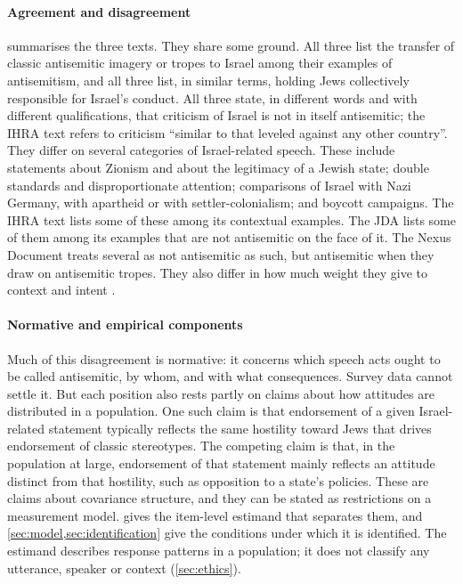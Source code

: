 \paragraph{Agreement and disagreement}
 summarises the three texts. They share some ground. All three list the transfer of classic antisemitic imagery or tropes to Israel among their examples of antisemitism, and all three list, in similar terms, holding Jews collectively responsible for Israel's conduct. All three state, in different words and with different qualifications, that criticism of Israel is not in itself antisemitic; the IHRA text refers to criticism ``similar to that leveled against any other country''. They differ on several categories of Israel-related speech. These include statements about Zionism and about the legitimacy of a Jewish state; double standards and disproportionate attention; comparisons of Israel with Nazi Germany, with apartheid or with settler-colonialism; and boycott campaigns. The IHRA text lists some of these among its contextual examples. The JDA lists some of them among its examples that are not antisemitic on the face of it. The Nexus Document treats several as not antisemitic as such, but antisemitic when they draw on antisemitic tropes. They also differ in how much weight they give to context and intent \citep{ihra2016,jda2021,nexus2021}.

\paragraph{Normative and empirical components}
Much of this disagreement is normative: it concerns which speech acts ought to be called antisemitic, by whom, and with what consequences. Survey data cannot settle it. But each position also rests partly on claims about how attitudes are distributed in a population. One such claim is that endorsement of a given Israel-related statement typically reflects the same hostility toward Jews that drives endorsement of classic stereotypes. The competing claim is that, in the population at large, endorsement of that statement mainly reflects an attitude distinct from that hostility, such as opposition to a state's policies. These are claims about covariance structure, and they can be stated as restrictions on a measurement model.  gives the item-level estimand that separates them, and \cref{sec:model,sec:identification} give the conditions under which it is identified. The estimand describes response patterns in a population; it does not classify any utterance, speaker or context (\cref{sec:ethics}).

